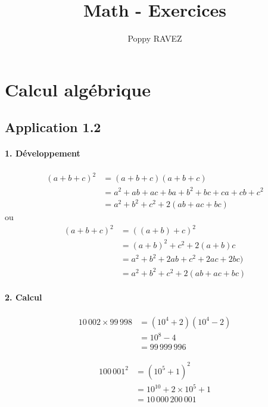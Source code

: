 \documentclass{report}
\title{Math - Exercices}
\author{Poppy RAVEZ}
\begin{document}
\chapter{Calcul algébrique}

\section*{Application 1.2}

\subsubsection*{1. Développement}
\begin{equation*}
\begin{split}
	(a+b+c)^{2} &= (a+b+c)(a+b+c) \\
	            &= a^{2}+ab+ac+ba+b^{2}+bc+ca+cb+c^{2}\\
	            &= a^{2}+b^{2}+c^{2} + 2(ab+ac+bc)
\end{split}	
\end{equation*}
ou
\begin{equation*}
\begin{split}
	(a+b+c)^{2} &= ((a+b)+c)^2 \\
	&= (a+b)^{2}+c^{2}+2(a+b)c\\
	&= a^{2}+b^{2}+ 2ab +c^{2} +2ac+2bc) \\
	&= a^{2}+b^{2}+c^{2} +2(ab+ac+bc)
\end{split}	
\end{equation*}

\subsubsection*{2. Calcul}

\begin{equation*}
	\begin{split}
		10\,002 \times 99\,998 &= (10^4 +2)(10^4 - 2) \\
		                       &= 10^8 - 4 \\
		                       &= 99\,999\,996
	\end{split}
\end{equation*}

\begin{equation*}
	\begin{split}
		100\,001^2 &= (10^5 + 1)^2 \\
		           &= 10^{10} + 2 \times 10^5 + 1 \\
		           &= 10\,000\,200\,001
	\end{split}
\end{equation*}
\end{document}
